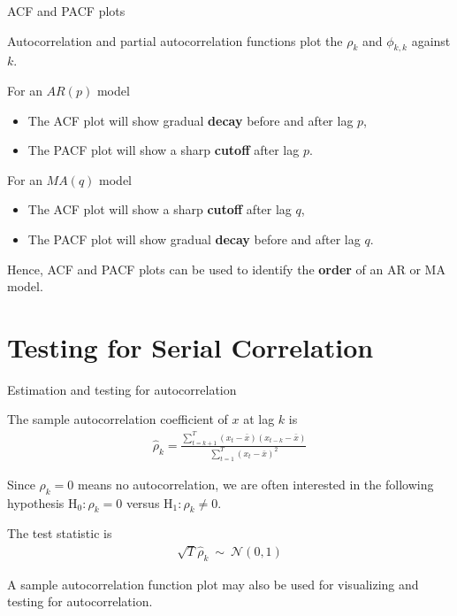 \documentclass[10pt,aspectratio=169]{beamer}  %
\begin{document}

\begin{frame}{ACF and PACF plots}

    \bigskip
    Autocorrelation and partial autocorrelation functions plot the $ \rho_{k} $ and $ \phi_{k,k} $ against $ k $.

    \medskip
    For an $ AR(p) $ model
    \begin{itemize}
        \item The ACF plot will show gradual \textbf{decay} before and after lag $ p $,
        \item The PACF plot will show a sharp \textbf{cutoff} after lag $ p $.
    \end{itemize}

    For an $ MA(q) $ model
    \begin{itemize}
        \item The ACF plot will show a sharp \textbf{cutoff} after lag $ q $,
        \item The PACF plot will show gradual \textbf{decay} before and after lag $ q $.
    \end{itemize}

    \medskip
    Hence, ACF and PACF plots can be used to identify the \textbf{order} of an AR or MA model.

\end{frame}


\section{Testing for Serial Correlation}


\begin{frame}{Estimation and testing for autocorrelation}

    \bigskip
    The sample autocorrelation coefficient of $ x $ at lag $ k $ is
    \begin{align*}
        \widehat{\rho}_{k} = \frac{\sum_{t=k+1}^{T} \left( x_{t} - \bar{x} \right) \left( x_{t-k} - \bar{x} \right)}{\sum_{t=1}^{T} \left( x_{t} - \bar{x} \right)^2}
    \end{align*}

    \medskip
    Since $ \rho_{k} = 0 $ means no autocorrelation, we are often interested in the following hypothesis $ \mathrm{H}_{0}: \rho_{k} = 0 $ versus $ \mathrm{H}_{1}: \rho_{k} \neq 0 $.

    \medskip
    The test statistic is
    \begin{align*}
            \sqrt{T} \widehat{\rho}_{k} \: \sim \: \mathcal{N}(0, 1)
    \end{align*}

    A sample autocorrelation function plot may also be used for visualizing and testing for autocorrelation.

\end{frame}
\end{document}
